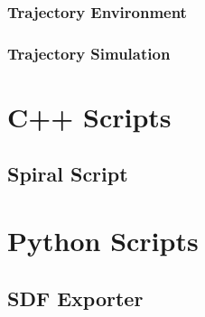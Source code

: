 \subsection{Trajectory Environment}

\clearpage

\subsection{Trajectory Simulation}

%
\clearpage


\chapter{C++ Scripts}
\section{Spiral Script}

\clearpage

\chapter{Python Scripts}
\section{SDF Exporter}

\clearpage

\clearpage